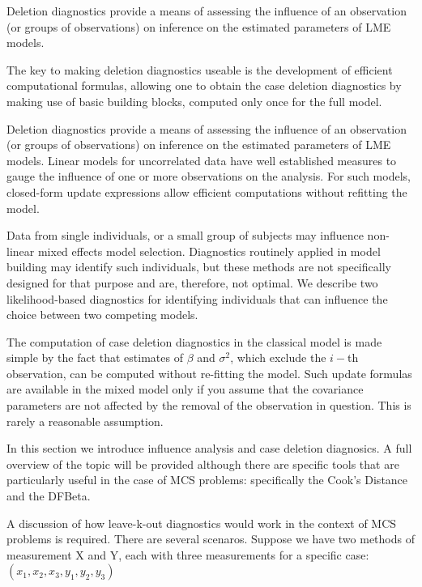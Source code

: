 \documentclass[12pt, a4paper]{report}
\theoremstyle{plain}
\theoremstyle{definition}
\theoremstyle{remark}
\begin{document}
	Deletion diagnostics provide a means of assessing the influence of an observation (or groups of observations) on inference on the estimated parameters of LME models.
	
	
	
	
	The key to making deletion diagnostics useable is the development of efficient computational formulas, allowing one to obtain the  case deletion diagnostics by making use of basic building blocks, computed only once for the full model.
	
	Deletion diagnostics provide a means of assessing the influence of an observation (or groups of observations) on inference on the estimated parameters of LME models. Linear models for uncorrelated data have well established measures to gauge the influence of one or more observations on the analysis. For such models, closed-form update expressions allow efficient computations without refitting the model.
	
	Data from single individuals, or a small group of subjects may influence non-linear mixed effects model selection. Diagnostics routinely applied in model building may identify such individuals, but these methods are not specifically designed for that purpose and are, therefore, not optimal. We describe two likelihood-based diagnostics for identifying individuals that can influence the choice between two competing models.
	
	
	The computation of case deletion diagnostics in the classical model is made simple by the fact that estimates of $\beta$ and $\sigma^2$, which exclude the $i-$th observation, can be computed without re-fitting the model. Such update formulas are available in the mixed model only if you assume that the covariance parameters are not affected by the removal of the observation in question. This is rarely a reasonable assumption.
	
	
	
	In this section we introduce influence analysis and case deletion diagnosics. A full overview of the topic will be provided although there are specific tools that are particularly useful in the case of MCS problems: specifically the Cook's Distance and the DFBeta.
	
	A discussion of how leave-k-out diagnostics would work in the context of MCS problems is required. There are several scenaros. Suppose we have two methods of measurement X and Y, each with three measurements for a specific case: $(x_1,x_2,x_3,y_1,y_2,y_3)$
	
\end{document}
